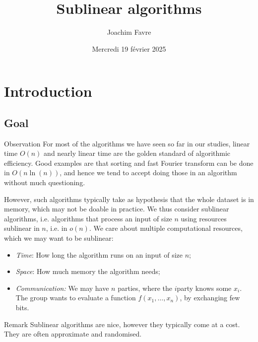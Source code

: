 \documentclass[a4paper]{article}
\title{Sublinear algorithms}
\author{Joachim Favre}
\date{Mercredi 19 février 2025}
\begin{document}
\maketitle


\section{Introduction}

\subsection{Goal}

\begin{parag}{Observation}
    For most of the algorithms we have seen so far in our studies, linear time $O\left(n\right)$ and nearly linear time are the golden standard of algorithmic efficiency. Good examples are that sorting and fast Fourier transform can be done in $O\left(n \ln\left(n\right)\right)$, and hence we tend to accept doing those in an algorithm without much questioning.

    However, such algorithms typically take as hypothesis that the whole dataset is in memory, which may not be doable in practice. We thus consider sublinear algorithms, i.e. algorithms that process an input of size $n$ using resources sublinear in $n$, i.e. in $o\left(n\right)$. We care about multiple computational resources, which we may want to be sublinear: 
    \begin{itemize}
        \item \textit{Time}: How long the algorithm runs on an input of size $n$;
        \item \textit{Space}: How much memory the algorithm needs;
        \item \textit{Communication:} We may have $n$ parties, where the $i$\Th party knows some $x_i$. The group wants to evaluate a function $f\left(x_1, \ldots, x_n\right)$, by exchanging few bits.
    \end{itemize}
    
    \begin{subparag}{Remark}
        Sublinear algorithms are nice, however they typically come at a cost. They are often approximate and randomised.
    \end{subparag}
\end{parag}
\end{document}
